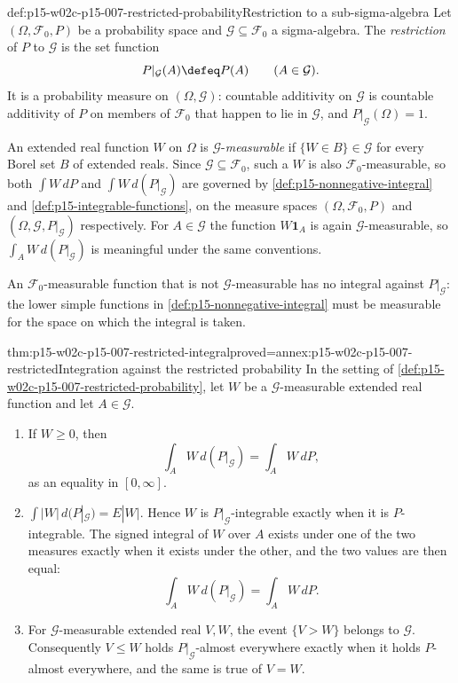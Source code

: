 \begin{hbdefinition}{def:p15-w02c-p15-007-restricted-probability}{Restriction to a sub-sigma-algebra}
Let \((\Omega,\mathcal F_0,P)\) be a probability space and
\(\mathcal G\subseteq\mathcal F_0\) a sigma-algebra. The
\emph{restriction} of \(P\) to \(\mathcal G\) is the set function
\[
                 P|_{\mathcal G}(A)\defeq P(A)\qquad(A\in\mathcal G).
\]
It is a probability measure on \((\Omega,\mathcal G)\): countable
additivity on \(\mathcal G\) is countable additivity of \(P\) on members
of \(\mathcal F_0\) that happen to lie in \(\mathcal G\), and
\(P|_{\mathcal G}(\Omega)=1\).

An extended real function \(W\) on \(\Omega\) is
\(\mathcal G\)-\emph{measurable} if \(\{W\in B\}\in\mathcal G\) for every
Borel set \(B\) of extended reals. Since \(\mathcal G\subseteq\mathcal F_0\),
such a \(W\) is also \(\mathcal F_0\)-measurable, so both
\(\int W\,dP\) and \(\int W\,d(P|_{\mathcal G})\) are governed by
\cref{def:p15-nonnegative-integral} and
\cref{def:p15-integrable-functions}, on the measure spaces
\((\Omega,\mathcal F_0,P)\) and \((\Omega,\mathcal G,P|_{\mathcal G})\)
respectively. For \(A\in\mathcal G\) the function \(W\mathbf1_A\) is again
\(\mathcal G\)-measurable, so \(\int_AW\,d(P|_{\mathcal G})\) is meaningful
under the same conventions.

An \(\mathcal F_0\)-measurable function that is not \(\mathcal G\)-measurable
has no integral against \(P|_{\mathcal G}\): the lower simple functions in
\cref{def:p15-nonnegative-integral} must be measurable for the space on
which the integral is taken.
\end{hbdefinition}

\begin{hblemma}{thm:p15-w02c-p15-007-restricted-integral}{proved=annex:p15-w02c-p15-007-restricted}{Integration against the restricted probability}
In the setting of \cref{def:p15-w02c-p15-007-restricted-probability}, let
\(W\) be a \(\mathcal G\)-measurable extended real function and let
\(A\in\mathcal G\).
\begin{enumerate}
\item If \(W\geq0\), then
      \[
        \int_AW\,d(P|_{\mathcal G})=\int_AW\,dP,
      \]
      as an equality in \([0,\infty]\).
\item \(\int|W|\,d(P|_{\mathcal G})=E|W|\). Hence \(W\) is
      \(P|_{\mathcal G}\)-integrable exactly when it is \(P\)-integrable.
      The signed integral of \(W\) over \(A\) exists under one of the two
      measures exactly when it exists under the other, and the two values
      are then equal:
      \[
        \int_AW\,d(P|_{\mathcal G})=\int_AW\,dP.
      \]
\item For \(\mathcal G\)-measurable extended real \(V,W\), the event
      \(\{V>W\}\) belongs to \(\mathcal G\). Consequently
      \(V\leq W\) holds \(P|_{\mathcal G}\)-almost everywhere exactly when
      it holds \(P\)-almost everywhere, and the same is true of
      \(V=W\).
\end{enumerate}
\end{hblemma}

